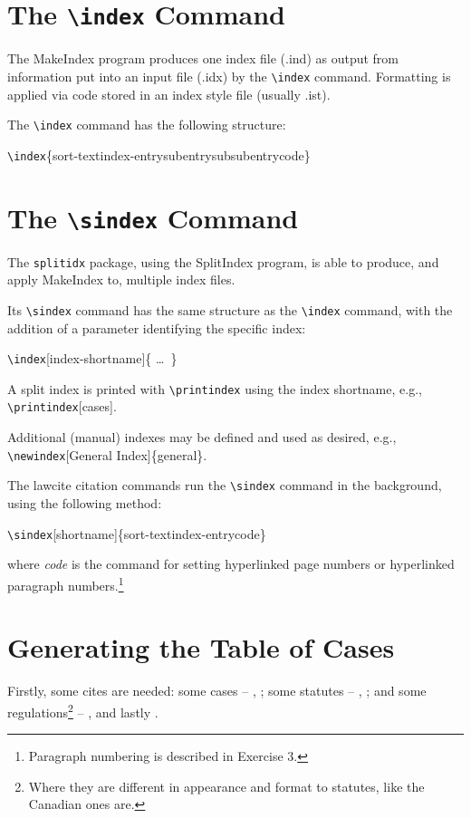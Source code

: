 \section{The \texttt{\textbackslash index} Command}
The MakeIndex program produces one index file (.ind) as output from information put into an input file (.idx) by the \texttt{\textbackslash index} command. Formatting is applied via code stored in an index style file (usually .ist).

The \texttt{\textbackslash index} command has the following structure:

\colorbox{yellow!50!green!20}{\texttt{\textbackslash index}\{sort-textindex-entry\markthis{!}subentry\markthis{!}subsubentry\markthis{|}code\}}

\section{The \texttt{\textbackslash sindex} Command}
The \texttt{splitidx} package, using the SplitIndex program, is able to produce, and apply MakeIndex to, multiple index files.

Its \texttt{\textbackslash sindex} command has the same structure as the \texttt{\textbackslash index} command, with the addition of a parameter identifying the specific index:

\colorbox{yellow!50!green!20}{\texttt{\textbackslash index}[index-shortname]\{ \ldots\ \}}

A split index is printed with \texttt{\textbackslash printindex} using the index shortname, e.g., \colorbox{yellow!50!green!20}{\texttt{\textbackslash printindex}[cases]}.

Additional (manual) indexes may be defined and used as desired, e.g., \colorbox{yellow!50!green!20}{\texttt{\textbackslash newindex}[General Index]\{general\}}.

The lawcite citation commands run the \texttt{\textbackslash sindex} command in the background, using the following method:

\colorbox{yellow!50!green!20}{\texttt{\textbackslash sindex}[shortname]\{sort-textindex-entry\markthis{|}code\}}

\noindent where \textit{code} is the command for setting hyperlinked page numbers or hyperlinked paragraph numbers.\footnote{Paragraph numbering is described in Exercise 3.}

\section{Generating the Table of Cases}
\lcsetstyleaglc\setallabove
Firstly, some cites are needed: some cases -- , \lcsetstyleindigo{}; some statutes -- 
\lcsetstylemcgill\setallabove
{},
\lcsetstyleaglc\setallabove
{}; 
and some regulations\footnote{Where they are different in appearance and format to statutes, like the Canadian ones are.} -- 
\lcsetstylemcgill\setallabove
{}, and lastly .


